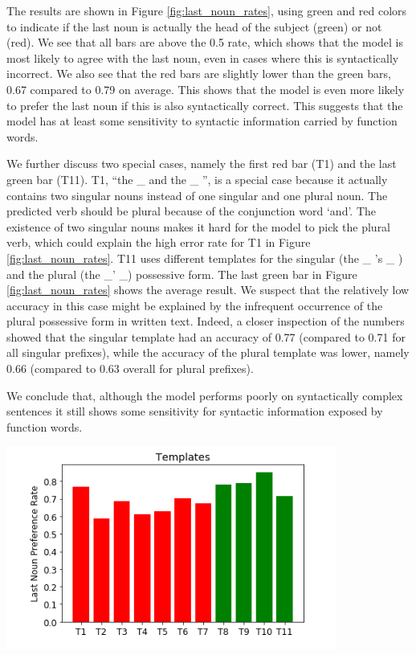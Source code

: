 \begin{multicols}{2}
The results are shown in Figure \ref{fig:last_noun_rates},
using green and red colors to indicate if 
the last noun is actually the head of the subject (green)
or not (red). 
%
We see that all bars are above the 0.5 rate,
which shows that the model is most
likely to agree with the last noun,
even in cases where this is syntactically incorrect. 
%
We also see that the red bars are slightly
lower than the green bars,
0.67 compared to 0.79 on average.
This shows that the model is even more likely
to prefer the last noun if this is
also syntactically correct.
This suggests that the model has 
at least some sensitivity
to syntactic information carried by function words.
%

%
We further discuss two special cases,
namely the first red bar (T1) and 
the last green bar (T11).
T1, ``the \_ and the \_ '', is a special case because it 
actually contains two singular nouns
instead of one singular and one plural noun. 
The predicted verb should be plural because of the
conjunction word `and'.
The existence of two singular nouns 
makes it hard for the model
to pick the plural verb,
which could explain the high error rate
for T1 in Figure \ref{fig:last_noun_rates}.
%
T11 uses different templates for the singular 
(the \_ 's \_ ) and the plural (the \_' \_) possessive form.
The last green bar in Figure \ref{fig:last_noun_rates} shows the average result.
We suspect that the relatively low accuracy
in this case might be explained by the infrequent
occurrence of the plural possessive form in written text.
Indeed, a closer inspection of the numbers showed that
the singular template had an accuracy
of 0.77 (compared to 0.71 for all singular prefixes), 
while the accuracy of the plural template
was lower, namely 0.66 (compared to 0.63 overall for plural prefixes).
%

We conclude that, although the model 
performs poorly on syntactically complex sentences it
still shows some sensitivity for syntactic 
information exposed by function words. 


\begin{Figure}
    \centering

\includegraphics[scale=0.5]{screenshot-syntactic-templates} 
\label{fig:last_noun_rates}
\end{Figure}



\end{multicols}
